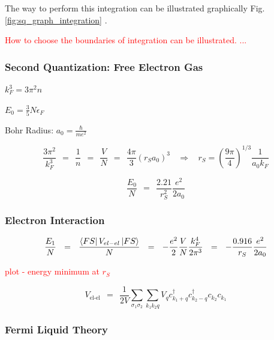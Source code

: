 \documentclass[10pt]{report}
\numberwithin{equation}{chapter}
\newcommand{\myRef}[1]{
  Fig.\ref{#1}
}
\begin{document}
The way to perform this integration can be illustrated graphically \myRef{fig:sq_graph_integration}. 

\textcolor{red}{How to choose the boundaries of integration can be illustrated. ...}










\subsubsection*{Second Quantization: Free Electron Gas} %

$ k_F^3 = 3 \pi^2 n$

$ E_0 = \frac{3}{5} N \epsilon_F$

Bohr Radius: $a_0 = \frac{\hbar}{m e^2}$

\begin{equation*}
\frac{3 \pi^2}{k_F^3} ~~ = ~~ \frac{1}{n} ~~ = ~~ \frac{V}{N} ~~ = ~~ \frac{4\pi}{3} \left(r_S a_0 \right)^3 ~~~~ \Rightarrow ~~~~ r_S = \left( \frac{9\pi}{4} \right)^{1/3} \frac{1}{a_0 k_F}
\end{equation*}

\begin{equation*}
\frac{E_0}{N} ~~ = ~~ \frac{2.21}{r_S^2} \frac{e^2}{2a_0}
\end{equation*}



\subsubsection*{Electron Interaction}

\begin{equation*}
  \frac{E_1}{N} ~~ = ~~ \frac{\bra{FS} V_{el-el} \ket{FS}}{N} ~~ = ~~ 
  - \frac{e^2}{2} \frac{V}{N} \frac{k_F^4}{2 \pi^3} ~~=~~ - \frac{0.916}{r_S} \frac{e^2}{2 a_0}
\end{equation*}


\textcolor{red}{plot - energy minimum at $r_S$}


\begin{equation}
  V_\text{el-el} ~~=~~ \frac{1}{2V} \sum_{\sigma_1 \sigma_2} \sum_{k_1 k_2 q} 
    V_q c_{k_1+q}^\dag c_{k_2-q}^\dag c_{k_2} c_{k_1}
\end{equation}



\subsubsection{Fermi Liquid Theory}
\end{document}
